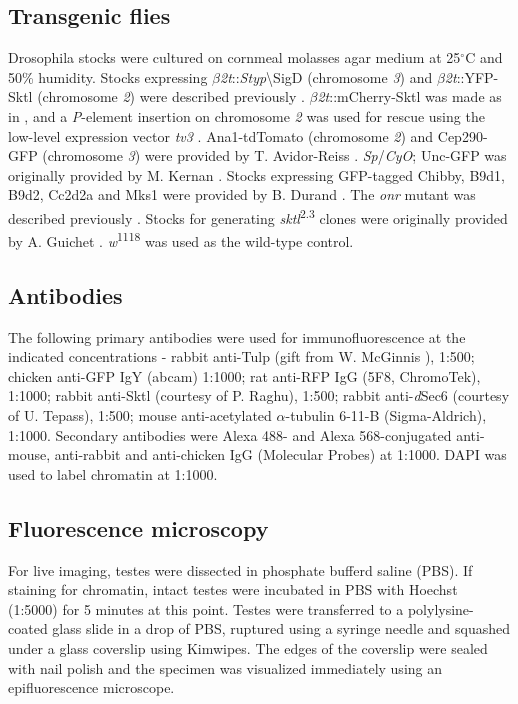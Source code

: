 \documentclass[12pt, twoside, letterpaper]{article}
\begin{document}
\subsection{Transgenic flies}
Drosophila stocks were cultured on cornmeal molasses agar medium at 25$^{\circ}$C
and 50\% humidity.
Stocks expressing $\beta$\textit{2t}::\textit{Styp}\textbackslash{SigD} (chromosome \textit{3})
and $\beta$\textit{2t}::YFP-Sktl (chromosome \textit{2})
were described previously \citep{wei2008depletion, fabian2010phosphatidylinositol}.
$\beta$\textit{2t}::mCherry-Sktl was made as in \citep{wei2008depletion},
and a \textit{P}-element insertion on chromosome \textit{2} was used for rescue using the low-level
expression vector \textit{tv3} \citep{wong2005pip2}.
Ana1-tdTomato (chromosome \textit{2}) and Cep290-GFP (chromosome \textit{3}) were provided
by T. Avidor-Reiss \citep{basiri2014migrating}.
\textit{Sp}/\textit{CyO}; Unc-GFP was originally provided by M. Kernan \citep{baker2004mechanosensory}.
Stocks expressing GFP-tagged Chibby, B9d1, B9d2, Cc2d2a and Mks1 were
provided by B. Durand \citep{enjolras2012drosophila, vieillard2016transition}.
The \textit{onr} mutant was described previously \citep{giansanti2015exocyst}.
Stocks for generating \textit{sktl}\textsuperscript{2.3} clones were originally provided by
A. Guichet \citep{gervais2008pip5k}.
\textit{w}\textsuperscript{1118} was used as the wild-type control.

\subsection{Antibodies}
The following primary antibodies were used for immunofluorescence
at the indicated concentrations -
rabbit anti-Tulp (gift from W. McGinnis \citep{ronshaugen2002structure}), 1:500;
chicken anti-GFP IgY (abcam) 1:1000;
rat anti-RFP IgG (5F8, ChromoTek), 1:1000;
rabbit anti-Sktl (courtesy of P. Raghu), 1:500;
rabbit anti-\textit{d}Sec6 (courtesy of U. Tepass), 1:500;
mouse anti-acetylated $\alpha$-tubulin 6-11-B (Sigma-Aldrich), 1:1000.
Secondary antibodies were Alexa 488- and Alexa 568-conjugated
anti-mouse, anti-rabbit and anti-chicken
IgG (Molecular Probes) at 1:1000.
DAPI was used to label chromatin at 1:1000.

\subsection{Fluorescence microscopy}
For live imaging, testes were dissected in phosphate bufferd saline (PBS).
If staining for chromatin, intact testes were incubated in PBS with
Hoechst (1:5000) for 5 minutes at this point.
Testes were transferred to a polylysine-coated glass slide in a drop of PBS,
ruptured using a syringe needle and
squashed under a glass coverslip using Kimwipes.
The edges of the coverslip were sealed with nail polish
and the specimen was visualized immediately using an epifluorescence microscope.
\end{document}
